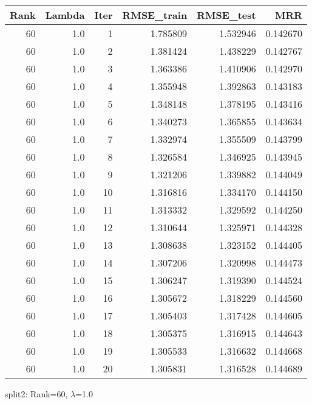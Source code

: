 \begin{tabular}{rrrrrr}
\toprule
 Rank &  Lambda &  Iter &  RMSE\_train &  RMSE\_test &       MRR \\
\midrule
   60 &     1.0 &     1 &    1.785809 &   1.532946 &  0.142670 \\
   60 &     1.0 &     2 &    1.381424 &   1.438229 &  0.142767 \\
   60 &     1.0 &     3 &    1.363386 &   1.410906 &  0.142970 \\
   60 &     1.0 &     4 &    1.355948 &   1.392863 &  0.143183 \\
   60 &     1.0 &     5 &    1.348148 &   1.378195 &  0.143416 \\
   60 &     1.0 &     6 &    1.340273 &   1.365855 &  0.143634 \\
   60 &     1.0 &     7 &    1.332974 &   1.355509 &  0.143799 \\
   60 &     1.0 &     8 &    1.326584 &   1.346925 &  0.143945 \\
   60 &     1.0 &     9 &    1.321206 &   1.339882 &  0.144049 \\
   60 &     1.0 &    10 &    1.316816 &   1.334170 &  0.144150 \\
   60 &     1.0 &    11 &    1.313332 &   1.329592 &  0.144250 \\
   60 &     1.0 &    12 &    1.310644 &   1.325971 &  0.144328 \\
   60 &     1.0 &    13 &    1.308638 &   1.323152 &  0.144405 \\
   60 &     1.0 &    14 &    1.307206 &   1.320998 &  0.144473 \\
   60 &     1.0 &    15 &    1.306247 &   1.319390 &  0.144524 \\
   60 &     1.0 &    16 &    1.305672 &   1.318229 &  0.144560 \\
   60 &     1.0 &    17 &    1.305403 &   1.317428 &  0.144605 \\
   60 &     1.0 &    18 &    1.305375 &   1.316915 &  0.144643 \\
   60 &     1.0 &    19 &    1.305533 &   1.316632 &  0.144668 \\
   60 &     1.0 &    20 &    1.305831 &   1.316528 &  0.144689 \\
\bottomrule
\end{tabular}

\caption{split2: Rank=60, $\lambda$=1.0}

